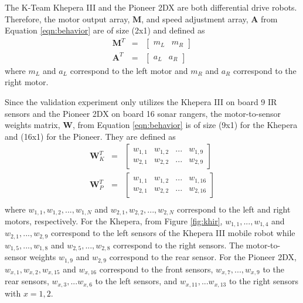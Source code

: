       The K-Team Khepera III and the Pioneer 2DX are both differential drive
        robots.
      Therefore, the motor output array, $\mathbf{M}$, and speed adjustment 
        array, $\mathbf{A}$ from Equation \ref{eqn:behavior} are of size (2x1) 
        and defined as
       \begin{eqnarray*}
         \mathbf{M}^{T}&=&\left[\begin{array}{cc}m_{L} & m_{R}\end{array}\right]\\
         \mathbf{A}^{T}&=&\left[\begin{array}{cc}a_{L} & a_{R}\end{array}\right]
       \end{eqnarray*}
       where $m_{L}$ and $a_{L}$ correspond to the left motor and
       $m_{R}$ and $a_{R}$ correspond to the right motor.

      Since the validation experiment only utilizes the Khepera III on board 9 IR 
        sensors and the Pioneer 2DX on board 16 sonar rangers, the 
        motor-to-sensor weights matrix, $\mathbf{W}$, from Equation 
        \ref{eqn:behavior} is of size (9x1) for the Khepera and (16x1) for the 
        Pioneer.
      They are defined as 
        \begin{eqnarray*}
         \mathbf{W}_{K}^{T}&=&\left[
         \begin{array}{cccc}
           w_{1,1} & w_{1,2} & ... & w_{1,9}\\
           w_{2,1} & w_{2,2} & ... & w_{2,9}
         \end{array}
         \right]\\
         \mathbf{W}_{P}^{T}&=&\left[
         \begin{array}{cccc}
           w_{1,1} & w_{1,2} & ... & w_{1,16}\\
           w_{2,1} & w_{2,2} & ... & w_{2,16}
         \end{array}
         \right]\\
        \end{eqnarray*}
        where $w_{1,1},w_{1,2},...,w_{1,N}$ and $w_{2,1},w_{2,2},...,w_{2,N}$ 
        correspond to the left and right motors, respectively.
      For the Khepera, from Figure \ref{fig:khir}, $w_{1,1},...,w_{1,4}$ and 
        $w_{2,1},...,w_{2,9}$ correspond to the left sensors of the Khepera III 
        mobile robot while $w_{1,5},...,w_{1,8}$ and $w_{2,5},...,w_{2,8}$ 
        correspond to the right sensors.
      The motor-to-sensor weights $w_{1,9}$ and $w_{2,9}$ correspond to the 
        rear sensor.
      For the Pioneer 2DX, $w_{x,1},w_{x,2},w_{x,15}$ and $w_{x,16}$
        correspond to the front sensors, $w_{x,7},...,w_{x,9}$ to the rear 
        sensors, $w_{x,3},...w_{x,6}$ to the left sensors, and
        $w_{x,11},...w_{x,13}$ to the right sensors with $x=1,2$.

